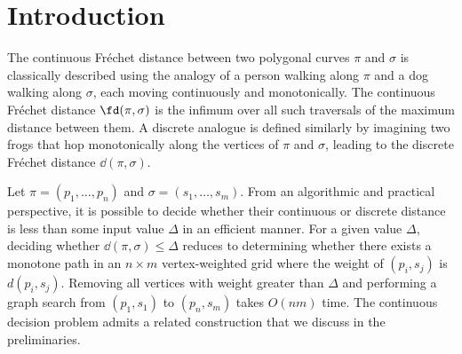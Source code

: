 \section{Introduction}

The continuous Fréchet distance between two polygonal curves $\pi$ and $\sigma$ is classically described using the analogy of a person walking along $\pi$ and a dog walking along $\sigma$, each moving continuously and monotonically. The continuous Fréchet distance $\fd(\pi, \sigma)$ is the infimum over all such traversals of the maximum distance between them. A discrete analogue is defined similarly by imagining two frogs that hop monotonically along the vertices of $\pi$ and $\sigma$, leading to the discrete Fréchet distance $\dd(\pi, \sigma)$.

Let $\pi = (p_1,\ldots,p_n)$ and $\sigma = (s_1,\ldots,s_m)$. From an algorithmic and practical perspective, it is possible to decide whether their continuous or discrete distance is less than some input value $\Delta$ in an efficient manner. For a given value $\Delta$, deciding whether $\dd(\pi, \sigma) \leq \Delta$ reduces to determining whether there exists a monotone path in an $n \times m$ vertex-weighted grid where the weight of $(p_i, s_j)$ is $d(p_i, s_j)$. Removing all vertices with weight greater than $\Delta$ and performing a graph search from $(p_1, s_1)$ to $(p_n, s_m)$ takes $O(n m)$ time. The continuous decision problem admits a related construction that we discuss in the preliminaries.

